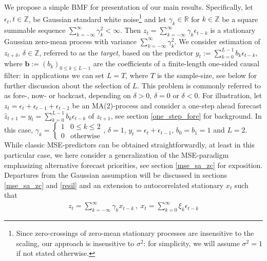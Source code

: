 \documentclass[a4paper]{article}
\begin{document}
We propose a simple BMF for presentation of our main results. Specifically, let 
$\epsilon_t, t \in \mathbb{Z}$, be Gaussian standard white noise\footnote{Since zero-crossings of zero-mean stationary processes are insensitive to the scaling, our approach is insensitive to $\sigma^2$: for simplicity, we will assume $\sigma^2=1$ if not stated otherwise.} and let $\gamma_k\in \mathbb{R}$ for $k \in \mathbb{Z}$ be a square summable sequence $\sum_{k=-\infty}^{\infty}\gamma_k^2<\infty$. Then $z_t=\sum_{k=-\infty}^{\infty}\gamma_k \epsilon_{t-k}$ is a stationary Gaussian zero-mean process with variance $\sum_{k=-\infty}^{\infty}\gamma_k^2$. We  consider estimation of $z_{t+\delta}$, $\delta \in \mathbb{Z}$, referred to as the \emph{target}, based on the predictor $y_t:=\sum_{k=0}^{L-1}b_{k}\epsilon_{t-k}$, where $\mathbf{b}:=(b_k)_{0\leq k\leq L-1}$ are the coefficients of a finite-length one-sided causal filter: in applications we can set $L=T$, where $T$ is the sample-size, see below for further discussion about the selection of $L$. This problem is commonly referred to as fore-, now- or backcast, depending on $\delta>0$, $\delta=0$ or $\delta<0$. For illustration, let $z_t=\epsilon_t+\epsilon_{t-1}+\epsilon_{t-2}$ be an MA(2)-process and consider a one-step ahead forecast $\hat{z}_{t+1}=y_t=\sum_{k=0}^{L-1}b_{k}\epsilon_{t-k}$ of $z_{t+1}$, see section \ref{one_step_fore} for background. In this case, $\gamma_k=\left\{\begin{array}{cc}1&0\leq k\leq 2\\0&\textrm{otherwise}\end{array}\right.$, $\delta=1$, $y_t=\epsilon_{t}+\epsilon_{t-1}$, $b_0=b_1=1$ and $L=2$. While classic MSE-predictors can be obtained straightforwardly, at least in this particular case, we here consider a generalization of the MSE-paradigm emphasizing alternative forecast priorities, see section \ref{mse_sa_zc} for exposition. %
Departures from the Gaussian assumption will be discussed in sections \ref{mse_sa_zc} and \ref{resil} and an extension to autocorrelated stationary $x_t$ such that 
\begin{eqnarray}\label{form_prob}
z_t=\sum_{k=-\infty}^{\infty}\gamma_k x_{t-k}~, ~x_t=\sum_{k=0}^{\infty}\xi_k\epsilon_{t-k}
\end{eqnarray}
\end{document}

